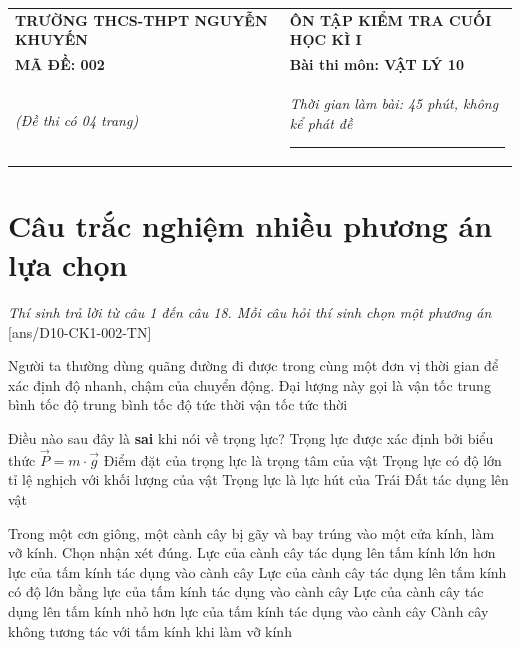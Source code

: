 \begin{center}
	\begin{tabular}{M{9.25cm}M{8.75cm}}
		\textbf{TRƯỜNG THCS-THPT NGUYỄN KHUYẾN}& \textbf{ÔN TẬP KIỂM TRA CUỐI HỌC KÌ I}\\
		\textbf{MÃ ĐỀ: 002}& \textbf{Bài thi môn: VẬT LÝ 10}\\
		\textit{(Đề thi có 04 trang)}& \textit{Thời gian làm bài: 45 phút, không kể phát đề}
		
		\noindent\rule{4cm}{0.8pt} \\
	\end{tabular}
\end{center}
\setcounter{section}{0}
\section{Câu trắc nghiệm nhiều phương án lựa chọn}
\textit{Thí sinh trả lời từ câu 1 đến câu 18. Mỗi câu hỏi thí sinh chọn một phương án}
\setcounter{ex}{0}
[ans/D10-CK1-002-TN]
\begin{ex}
	Người ta thường dùng quãng đường đi được trong cùng một đơn vị thời gian để xác định độ nhanh, chậm của chuyển động. Đại lượng này gọi là
	\choice
	{vận tốc trung bình}
	{\True tốc độ trung bình}
	{tốc độ tức thời}
	{vận tốc tức thời}
	\loigiai{}
\end{ex}
\begin{ex}
	Điều nào sau đây là \textbf{sai} khi nói về trọng lực?
	\choice
	{Trọng lực được xác định bởi biểu thức $\vec{P}=m\cdot\vec{g}$}
	{Điểm đặt của trọng lực là trọng tâm của vật}
	{\True Trọng lực có độ lớn tỉ lệ nghịch với khối lượng của vật}
	{Trọng lực là lực hút của Trái Đất tác dụng lên vật}
	\loigiai{}
\end{ex}
\begin{ex}
Trong một cơn giông, một cành cây bị gãy và bay trúng vào một cửa kính, làm vỡ kính. Chọn nhận xét đúng.	
	\choice
	{Lực của cành cây tác dụng lên tấm kính lớn hơn lực của tấm kính tác dụng vào cành cây}
	{\True Lực của cành cây tác dụng lên tấm kính có độ lớn bằng lực của tấm kính tác dụng vào cành cây}
	{Lực của cành cây tác dụng lên tấm kính nhỏ hơn lực của tấm kính tác dụng vào cành cây}
	{Cành cây không tương tác với tấm kính khi làm vỡ kính}
	\loigiai{}
\end{ex}
